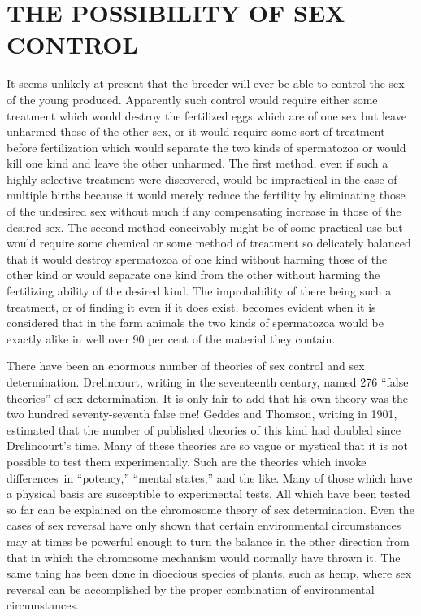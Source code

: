 \section*{THE POSSIBILITY OF SEX CONTROL}

It seems unlikely at present that the breeder will ever be able to
control the sex of the young produced. Apparently such control would
require either some treatment which would destroy the fertilized eggs
which are of one sex but leave unharmed those of the other sex, or it
would require some sort of treatment before fertilization which would
separate the two kinds of spermatozoa or would kill one kind and leave
the other unharmed. The first method, even if such a highly selective
treatment were discovered, would be impractical in the case of multiple
births because it would merely reduce the fertility by eliminating those
of the undesired sex without much if any compensating increase in
those of the desired sex. The second method conceivably might be of
some practical use but would require some chemical or some method of
treatment so delicately balanced that it would destroy spermatozoa of
one kind without harming those of the other kind or would separate
one kind from the other without harming the fertilizing ability of the
desired kind. The improbability of there being such a treatment, or of
finding it even if it does exist, becomes evident when it is considered
that in the farm animals the two kinds of spermatozoa would be exactly
alike in well over 90 per cent of the material they contain.

There have been an enormous number of theories of sex control
and sex determination. Drelincourt, writing in the seventeenth century,
named 276 ``false theories'' of sex determination. It is only fair to add
that his own theory was the two hundred seventy-seventh false one!
Geddes and Thomson, writing in 1901, estimated that the number of
published theories of this kind had doubled since Drelincourt's time.
Many of these theories are so vague or mystical that it is not possible to
test them experimentally. Such are the theories which invoke differences\
in ``potency,'' ``mental states,'' and the like. Many of those which
have a physical basis are susceptible to experimental tests. All which
have been tested so far can be explained on the chromosome theory of
sex determination. Even the cases of sex reversal have only shown that
certain environmental circumstances may at times be powerful enough
to turn the balance in the other direction from that in which the chromosome
mechanism would normally have thrown it. The same thing
has been done in dioecious species of plants, such as hemp, where sex
reversal can be accomplished by the proper combination of environmental
circumstances.

